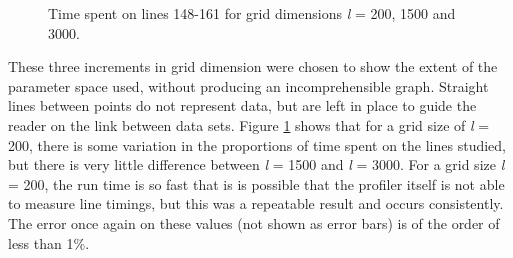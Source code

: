 \documentclass[12pt,a4paper]{article}
\begin{document}
\begin{figure}[h]
\begin{center}
\caption{Time spent on lines 148-161 for grid dimensions {\em l} = 200, 1500 and 3000.}
\label{fig:fig_time_on_lines}
\end{center}
\end{figure}

These three increments in grid dimension were chosen to show the extent of the parameter space used, without producing an incomprehensible graph. Straight lines between points do not represent data, but are left in place to guide the reader on the link between data sets. Figure \ref{fig:fig_time_on_lines} shows that for a grid size of {\em l} = 200, there is some variation in the proportions of time spent on the lines studied, but there is very little difference between {\em l} = 1500 and {\em l} = 3000. For a grid size {\em l} = 200, the run time is so fast that is is possible that the profiler itself is not able to measure line timings, but this was a repeatable result and occurs consistently. The error once again on these values (not shown as error bars) is of the order of less than 1\%.
\end{document}
